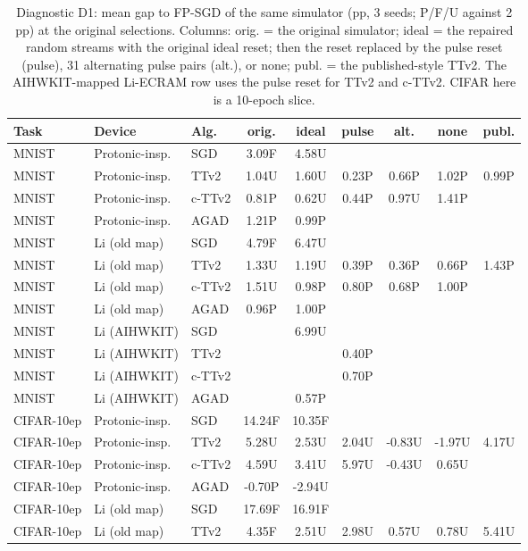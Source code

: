 \begin{table}[t]\centering\scriptsize\caption{Diagnostic D1: mean gap to FP-SGD of the same simulator (pp, 3 seeds; P/F/U against 2 pp) at the original selections. Columns: orig. = the original simulator; ideal = the repaired random streams with the original ideal reset; then the reset replaced by the pulse reset (pulse), 31 alternating pulse pairs (alt.), or none; publ. = the published-style TTv2. The AIHWKIT-mapped Li-ECRAM row uses the pulse reset for TTv2 and c-TTv2. CIFAR here is a 10-epoch slice.}\label{tab:rev_d1}
\begin{tabular}{lllcccccc}\toprule Task & Device & Alg. & orig. & ideal & pulse & alt. & none & publ.\\\midrule
MNIST & Protonic-insp. & SGD & 3.09F & 4.58U &  &  &  & \\
MNIST & Protonic-insp. & TTv2 & 1.04U & 1.60U & 0.23P & 0.66P & 1.02P & 0.99P\\
MNIST & Protonic-insp. & c-TTv2 & 0.81P & 0.62U & 0.44P & 0.97U & 1.41P & \\
MNIST & Protonic-insp. & AGAD & 1.21P & 0.99P &  &  &  & \\
MNIST & Li (old map) & SGD & 4.79F & 6.47U &  &  &  & \\
MNIST & Li (old map) & TTv2 & 1.33U & 1.19U & 0.39P & 0.36P & 0.66P & 1.43P\\
MNIST & Li (old map) & c-TTv2 & 1.51U & 0.98P & 0.80P & 0.68P & 1.00P & \\
MNIST & Li (old map) & AGAD & 0.96P & 1.00P &  &  &  & \\
MNIST & Li (AIHWKIT) & SGD &  & 6.99U &  &  &  & \\
MNIST & Li (AIHWKIT) & TTv2 &  &  & 0.40P &  &  & \\
MNIST & Li (AIHWKIT) & c-TTv2 &  &  & 0.70P &  &  & \\
MNIST & Li (AIHWKIT) & AGAD &  & 0.57P &  &  &  & \\
CIFAR-10ep & Protonic-insp. & SGD & 14.24F & 10.35F &  &  &  & \\
CIFAR-10ep & Protonic-insp. & TTv2 & 5.28U & 2.53U & 2.04U & -0.83U & -1.97U & 4.17U\\
CIFAR-10ep & Protonic-insp. & c-TTv2 & 4.59U & 3.41U & 5.97U & -0.43U & 0.65U & \\
CIFAR-10ep & Protonic-insp. & AGAD & -0.70P & -2.94U &  &  &  & \\
CIFAR-10ep & Li (old map) & SGD & 17.69F & 16.91F &  &  &  & \\
CIFAR-10ep & Li (old map) & TTv2 & 4.35F & 2.51U & 2.98U & 0.57U & 0.78U & 5.41U\\

\end{tabular}
\end{table}
